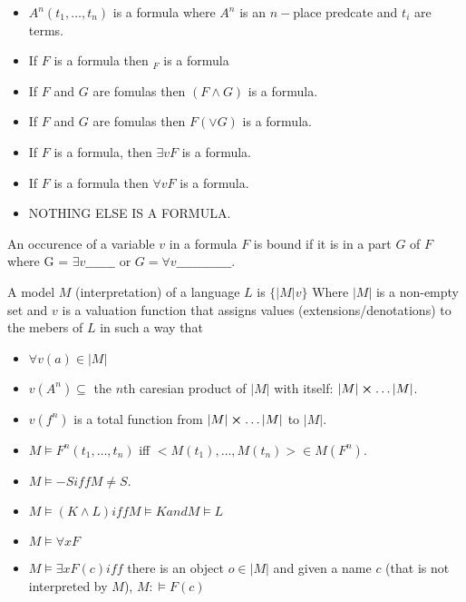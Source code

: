 \begin{definition}[Formula]
\begin{itemize}
\item $A^n(t_1,\dots,t_n)$ is a formula where $A^n$ is an $n-$place predcate and $t_i$ are terms.
\item If $F$ is a formula then $_F$ is a formula
\item If $F$ and $G$ are fomulas then $(F\wedge G)$ is a formula.
\item If $F$ and $G$ are fomulas then $F(\vee G)$ is a formula.
\item If $F$ is a formula, then $\exists vF$ is a formula.
\item If $F$ is a formula then $\forall vF$ is a formula.
\item NOTHING ELSE IS A FORMULA.
\end{itemize}
\end{definition}

\begin{definition}[Bound]
An occurence of a variable $v$ in a formula $F$ is bound if it is in a part $G$ of $F$ where
G = $\exists v \_\_\_\_\_\_\_$ or $G = \forall v \_\_\_\_\_\_\_\_\_\_\_\_\_.$
\end{definition}

\begin{definition}[Model]
A model $M$ (interpretation) of a language $L$ is $\{|M| v\}$ Where $|M|$ is a non-empty set and $v$ is a valuation function that assigns values (extensions/denotations) to the mebers of $L$ in such a way that 
\begin{itemize}
\item $\forall v(a) \in |M|$
\item $v(A^n) \subseteq$ the $n$th caresian product of $|M|$ with itself: $|M|\cross \dots |M|$.
\item $v(f^n)$ is a total function from $|M| \cross \dots |M|$ to $|M|$.
\end{itemize}
\end{definition}


\begin{definition}[Truth]
\begin{itemize}
\item $M \vDash F^n (t_1,\dots,t_n)$ iff $<M(t_1),\dots,M(t_n)> \in M(F^n)$.
\item $M \vDash -S iff M \not = S$.
\item $M \vDash (K \wedge L ) iff M \vDash K and M \vDash L$
\item $M \vDash \forall x F$
\item $M \vDash \exists x F(c) iff $ there is an object $o \in |M| $ and given a name $c$ (that is not interpreted by $M$), $M: \vDash F(c)$
\end{itemize}
\end{definition}

